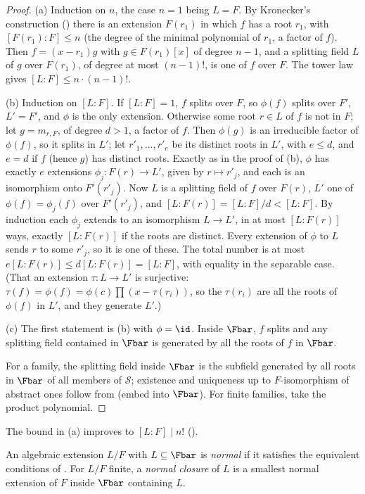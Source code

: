 \begin{proof}
(a) Induction on $n$, the case $n=1$ being $L=F$. By Kronecker's construction () there is an extension $F(r_1)$ in which $f$ has a root
$r_1$, with $[F(r_1):F]\le n$ (the degree of the minimal polynomial of $r_1$, a factor of $f$). Then $f=(x-r_1)g$ with $g\in F(r_1)[x]$ of degree $n-1$, and a
splitting field $L$ of $g$ over $F(r_1)$, of degree at most $(n-1)!$, is one of $f$ over $F$. The tower law gives $[L:F]\le n\cdot(n-1)!$.

(b) Induction on $[L:F]$. If $[L:F]=1$, $f$ splits over $F$, so $\phi(f)$ splits over $F'$, $L'=F'$, and $\phi$ is the only extension. Otherwise some root
$r\in L$ of $f$ is not in $F$; let $g=m_{r,F}$, of degree $d>1$, a factor of $f$. Then $\phi(g)$ is an irreducible factor of $\phi(f)$, so it splits in
$L'$; let $r'_1,\dots,r'_e$ be its distinct roots in $L'$, with $e\le d$, and $e=d$ if $f$ (hence $g$) has distinct roots. Exactly as in the proof of
(b), $\phi$ has exactly $e$ extensions $\phi_j\colon F(r)\to L'$, given by $r\mapsto r'_j$, and each is an isomorphism onto
$F'(r'_j)$. Now $L$ is a splitting field of $f$ over $F(r)$, $L'$ one of $\phi(f)=\phi_j(f)$ over $F'(r'_j)$, and $[L:F(r)]=[L:F]/d<[L:F]$. By induction each
$\phi_j$ extends to an isomorphism $L\to L'$, in at most $[L:F(r)]$ ways, exactly $[L:F(r)]$ if the roots are distinct. Every extension of $\phi$ to $L$
sends $r$ to some $r'_j$, so it is one of these. The total number is at most $e[L:F(r)]\le d[L:F(r)]=[L:F]$, with equality in the separable case. (That an
extension $\tau\colon L\to L'$ is surjective: $\tau(f)=\phi(f)=\phi(c)\prod(x-\tau(r_i))$, so the $\tau(r_i)$ are all the roots of $\phi(f)$ in $L'$, and they
generate $L'$.)

(c) The first statement is (b) with $\phi=\id$. Inside $\Fbar$, $f$ splits and any splitting field contained in $\Fbar$ is generated by all the roots of $f$ in
$\Fbar$.

For a family, the splitting field inside $\Fbar$ is the subfield generated by all roots in $\Fbar$ of all members of $\mathcal{S}$; existence and uniqueness up
to $F$-isomorphism of abstract ones follow from  (embed into $\Fbar$). For finite families, take the product polynomial.
\end{proof}

The bound in (a) improves to $[L:F]\mid n!$ ().

\begin{definition}\label{def:galois:normal}
An algebraic extension $L/F$ with $L\subseteq\Fbar$ is \emph{normal} if it satisfies the equivalent conditions of . For $L/F$ finite, a
\emph{normal closure} of $L$ is a smallest normal extension of $F$ inside $\Fbar$ containing $L$.
\end{definition}

